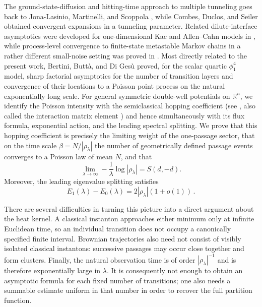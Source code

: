 \documentclass[a4paper,10pt]{article}
\numberwithin{equation}{section}
\theoremstyle{plain}
\theoremstyle{plain}
\theoremstyle{plain}
\theoremstyle{plain}
\theoremstyle{plain}
\theoremstyle{remark}
\theoremstyle{definition}
\newcommand{\abs}[1]{\left\lvert#1\right\rvert}
\begin{document}
The ground-state-diffusion and hitting-time approach to multiple tunneling goes back to Jona-Lasinio, Martinelli, and Scoppola \cite{JonaLasinioMartinelliScoppola1981}, while Combes, Duclos, and Seiler \cite{CombesDuclosSeiler1983} obtained convergent expansions in a tunneling parameter. Related dilute-interface asymptotics were developed for one-dimensional Kac and Allen--Cahn models in \cite{COP93,BBB08,Web10,OWW14}, while process-level convergence to finite-state metastable Markov chains in a rather different small-noise setting was proved in \cite{RS23}. Most directly related to the present work, Bertini, Butt{\`a}, and Di Ges{\`u} \cite{BBDG25} proved, for the scalar quartic $\phi^4_1$ model, sharp factorial asymptotics for the number of transition layers and convergence of their locations to a Poisson point process on the natural exponentially long scale. For general symmetric double-well potentials on $\mathbb{R}^n$, we identify the Poisson intensity with the semiclassical hopping coefficient (see \cite{FeffermanLeeThorpWeinstein2018,FeffermanShapiroWeinstein2022,Fefferman2025}, also called the interaction matrix element \cite{Helffer_Sjostrand_1984,DimassiSjostrand1999InteractionMatrix}) and hence simultaneously with its flux formula, exponential action, and the leading spectral splitting. We prove that this hopping coefficient is precisely the limiting weight of the one-passage sector, that on the time scale $\beta=N/\abs{\rho_\lambda}$ the number of geometrically defined passage events converges to a Poisson law of mean $N$, and that
\[
    \lim_{\lambda\to\infty}
    -\frac{1}{\lambda}\log\abs{\rho_\lambda}
    =
    S(d,-d).
\]
Moreover, the leading eigenvalue splitting satisfies
\[
    E_1(\lambda)-E_0(\lambda)
    =
    2\abs{\rho_\lambda}(1+o(1))\,.
\]


There are several difficulties in turning this picture into a direct
argument about the heat kernel. A classical instanton approaches either
minimum only at infinite Euclidean time, so an individual transition does
not occupy a canonically specified finite interval. Brownian trajectories
also need not consist of visibly isolated classical instantons: successive
passages may occur close together and form clusters. Finally, the natural
observation time is of order $\abs{\rho_\lambda}^{-1}$ and is therefore
exponentially large in $\lambda$. It is consequently not enough to obtain
an asymptotic formula for each fixed number of transitions; one also needs
a summable estimate uniform in that number in order to recover the full
partition function.
\end{document}
